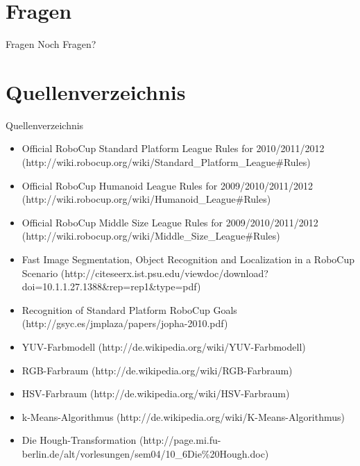 \documentclass{beamer}
\begin{document}
\section*{Fragen}
\begin{frame}{Fragen}
Noch Fragen?
\end{frame}

\section*{Quellenverzeichnis}
\begin{frame}{Quellenverzeichnis}
\begin{tiny}
\begin{itemize}
    \item Official RoboCup Standard Platform League Rules for 2010/2011/2012  (http://wiki.robocup.org/wiki/Standard\_Platform\_League\#Rules)
    \item Official RoboCup Humanoid League Rules for 2009/2010/2011/2012 (http://wiki.robocup.org/wiki/Humanoid\_League\#Rules)
    \item Official RoboCup Middle Size League Rules for 2009/2010/2011/2012 (http://wiki.robocup.org/wiki/Middle\_Size\_League\#Rules)
    \item Fast Image Segmentation, Object Recognition and Localization in a RoboCup Scenario (http://citeseerx.ist.psu.edu/viewdoc/download?doi=10.1.1.27.1388\&rep=rep1\&type=pdf)
    \item Recognition of Standard Platform RoboCup Goals (http://gsyc.es/jmplaza/papers/jopha-2010.pdf)
    \item YUV-Farbmodell (http://de.wikipedia.org/wiki/YUV-Farbmodell)
    \item RGB-Farbraum (http://de.wikipedia.org/wiki/RGB-Farbraum)
    \item HSV-Farbraum (http://de.wikipedia.org/wiki/HSV-Farbraum)
    \item k-Means-Algorithmus (http://de.wikipedia.org/wiki/K-Means-Algorithmus)
    \item Die Hough-Transformation (http://page.mi.fu-berlin.de/alt/vorlesungen/sem04/10\_6Die\%20Hough.doc)
\end{itemize}
\end{tiny}
\end{frame}
\end{document}
